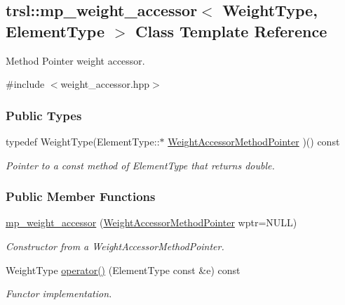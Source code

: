\hypertarget{classtrsl_1_1mp__weight__accessor}{
\subsection{trsl::mp\_\-weight\_\-accessor$<$ WeightType, ElementType $>$ Class Template Reference}
\label{classtrsl_1_1mp__weight__accessor}
}


Method Pointer weight accessor.  


{\ttfamily \#include $<$weight\_\-accessor.hpp$>$}\subsubsection*{Public Types}
\begin{DoxyCompactItemize}
\item 
\hypertarget{classtrsl_1_1mp__weight__accessor_af9df7e4d41291bf0e6f29ad10a0cb8c8}{
typedef WeightType(ElementType::$\ast$ \hyperlink{classtrsl_1_1mp__weight__accessor_af9df7e4d41291bf0e6f29ad10a0cb8c8}{WeightAccessorMethodPointer} )() const }
\label{classtrsl_1_1mp__weight__accessor_af9df7e4d41291bf0e6f29ad10a0cb8c8}

\begin{DoxyCompactList}\small\item\em Pointer to a const method of ElementType that returns double. \item\end{DoxyCompactList}\end{DoxyCompactItemize}
\subsubsection*{Public Member Functions}
\begin{DoxyCompactItemize}
\item 
\hyperlink{classtrsl_1_1mp__weight__accessor_a11a52dfed053534bf1003a917d2ec28b}{mp\_\-weight\_\-accessor} (\hyperlink{classtrsl_1_1mp__weight__accessor_af9df7e4d41291bf0e6f29ad10a0cb8c8}{WeightAccessorMethodPointer} wptr=NULL)
\begin{DoxyCompactList}\small\item\em Constructor from a WeightAccessorMethodPointer. \item\end{DoxyCompactList}\item 
WeightType \hyperlink{classtrsl_1_1mp__weight__accessor_aff20477c2a3c98508fe2f26effb49000}{operator()} (ElementType const \&e) const 
\begin{DoxyCompactList}\small\item\em Functor implementation. \item\end{DoxyCompactList}\end{DoxyCompactItemize}


